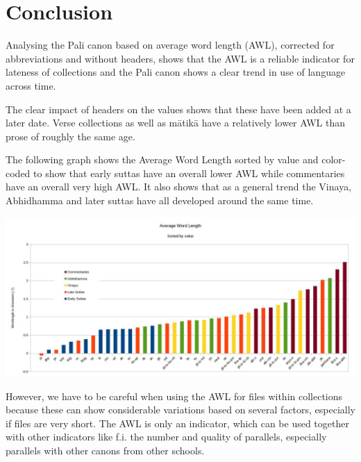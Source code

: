 \section{Conclusion}
Analysing the Pali canon based on average word length (AWL), corrected for abbreviations and without headers, shows that the AWL is a reliable indicator for lateness of collections and the Pali canon shows a clear trend in use of language across time. 

The clear impact of headers on the values shows that these have been added at a later date.
Verse collections as well as mātikā have a relatively lower AWL than prose of roughly the same age. 

The following graph shows the Average Word Length sorted by value and color-coded to show that early suttas have an overall lower AWL while commentaries have an overall very high AWL. It also shows that as a general trend the Vinaya, Abhidhamma and later suttas have all developed around the same time.

\includegraphics[width=\linewidth]{awlsorted.jpg}
\label{awlsorted}

\medskip
However, we have to be careful when using the AWL for files within collections because these can show considerable variations based on several factors, especially if files are very short. The AWL is only an indicator, which can be used together with other indicators like f.i. the number and quality of parallels, especially parallels with other canons from other schools. 
